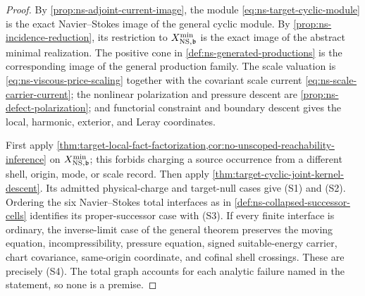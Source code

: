 \documentclass[11pt]{article}
\numberwithin{section}{part}
\theoremstyle{plain}
\theoremstyle{definition}
\theoremstyle{remark}
\begin{document}
\begin{proof}
By \cref{prop:ns-adjoint-current-image}, the module
\eqref{eq:ns-target-cyclic-module} is the exact Navier--Stokes image of the
general cyclic module.  By \cref{prop:ns-incidence-reduction}, its restriction
to \(X^{\min}_{{\rm NS},\mathfrak b}\) is the exact image of the abstract
minimal realization.  The positive cone in
\cref{def:ns-generated-productions} is the corresponding image of the
general production family.  The scale valuation is
\eqref{eq:ns-viscous-price-scaling} together with the covariant scale current
\eqref{eq:ns-scale-carrier-current}; the nonlinear polarization and pressure
descent are
\cref{prop:ns-defect-polarization}; and functorial constraint and boundary
descent gives the local, harmonic, exterior, and Leray coordinates.

First apply
\cref{thm:target-local-fact-factorization,cor:no-unscoped-reachability-inference}
on \(X^{\min}_{{\rm NS},\mathfrak b}\); this forbids charging a source occurrence from a
different shell, origin, mode, or scale record.  Then apply
\cref{thm:target-cyclic-joint-kernel-descent}.  Its admitted physical-charge
and target-null cases give \textup{(S1)} and \textup{(S2)}.  Ordering the six
Navier--Stokes total interfaces as in
\cref{def:ns-collapsed-successor-cells} identifies its proper-successor case
with \textup{(S3)}.  If every finite interface is ordinary, the inverse-limit
case of the general theorem preserves the moving equation, incompressibility,
pressure equation, signed suitable-energy carrier, chart covariance,
same-origin coordinate, and cofinal shell crossings.  These are precisely
\textup{(S4)}.  The total graph accounts for each analytic failure named in
the statement, so none is a premise.
\end{proof}
\end{document}
